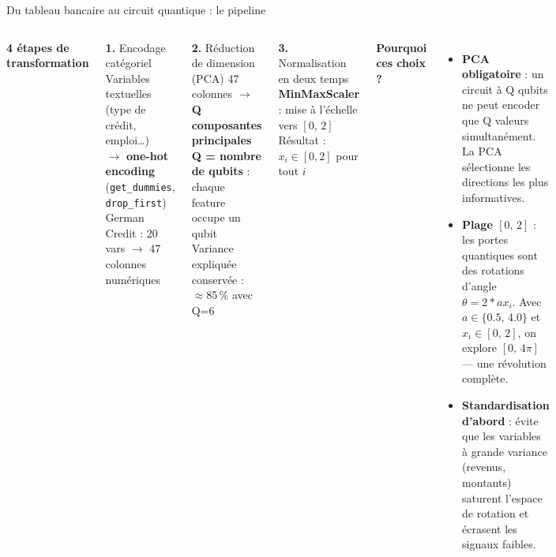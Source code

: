\documentclass[aspectratio=169]{beamer}
\begin{document}
\begin{frame}{Du tableau bancaire au circuit quantique : le pipeline}
  \begin{columns}[T]
      \textbf{4 étapes de transformation}\\[5pt]

      \begin{block}{\small \textbf{1.} Encodage catégoriel}
        \footnotesize
        Variables textuelles (type de crédit, emploi\ldots)\\
        $\rightarrow$ \textbf{one-hot encoding} (\texttt{get\_dummies}, \texttt{drop\_first})\\
        German Credit : 20 vars $\rightarrow$ 47 colonnes numériques
      \end{block}
      

      \begin{block}{\small \textbf{2.} Réduction de dimension (PCA)}
        \footnotesize
        47 colonnes $\rightarrow$ \textbf{Q composantes principales}\\
        \textbf{Q = nombre de qubits} : chaque feature occupe un qubit\\
        Variance expliquée conservée : $\approx$85\,\% avec Q=6
      \end{block}
      

      \begin{block}{\small \textbf{3.} Normalisation en deux temps}
        \footnotesize
        \textbf{MinMaxScaler} : mise à l'échelle vers $[0,\,2]$\\
        Résultat : $x_i \in [0, 2]$ pour tout $i$
      \end{block}

      \textbf{Pourquoi ces choix ?}\\[6pt]
      \begin{itemize}\small
        \item \textbf{PCA obligatoire} : un circuit à Q qubits
              ne peut encoder que Q valeurs simultanément.
              La PCA sélectionne les directions les plus informatives.

        \bigskip
        \item \textbf{Plage $[0,\,2]$} : les portes quantiques
              sont des rotations d'angle $\theta = 2*a x_i$.
              Avec $a \in \{0.5,\,4.0\}$ et $x_i \in [0,\,2]$,
              on explore $[0,\,4\pi]$ — une révolution complète.

        \bigskip
        \item \textbf{Standardisation d'abord} : évite que
              les variables à grande variance (revenus, montants)
              saturent l'espace de rotation et écrasent
              les signaux faibles.
      \end{itemize}


\end{columns}
\end{frame}
\end{document}
